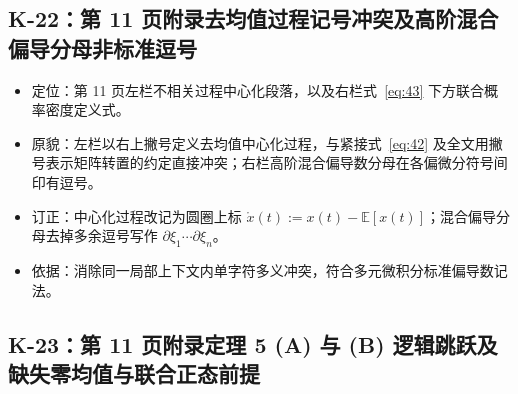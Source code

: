 \subsection{K-22：第 11 页附录去均值过程记号冲突及高阶混合偏导分母非标准逗号}\label{sec:k22}

\begin{itemize}
\item 定位：第 11 页左栏不相关过程中心化段落，以及右栏式~\eqref{eq:43} 下方联合概率密度定义式。
\item 原貌：左栏以右上撇号定义去均值中心化过程，与紧接式~\eqref{eq:42} 及全文用撇号表示矩阵转置的约定直接冲突；右栏高阶混合偏导数分母在各偏微分符号间印有逗号。
\item 订正：中心化过程改记为圆圈上标 $\mathring{x}(t) := x(t) - \mathbb{E}[x(t)]$；混合偏导分母去掉多余逗号写作 $\partial\xi_1 \cdots \partial\xi_n$。
\item 依据：消除同一局部上下文内单字符多义冲突，符合多元微积分标准偏导数记法。
\end{itemize}

\subsection{K-23：第 11 页附录定理 5 (A) 与 (B) 逻辑跳跃及缺失零均值与联合正态前提}\label{sec:k23}


